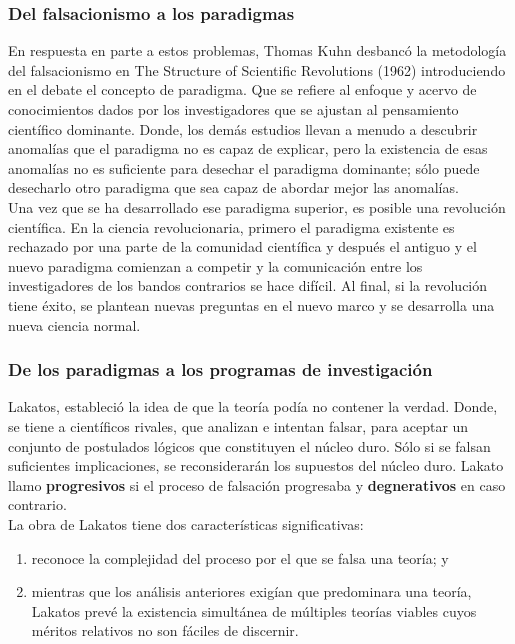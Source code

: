 \documentclass[10pt]{book}
\begin{document}
\subsubsection{Del falsacionismo a los paradigmas}
En respuesta en parte a estos problemas, Thomas Kuhn desbancó la metodología del falsacionismo en The Structure of Scientific Revolutions (1962) introduciendo en el debate el concepto de paradigma. Que se refiere al enfoque y acervo de conocimientos dados por los investigadores que se ajustan al pensamiento científico dominante. Donde, los demás estudios llevan a menudo a descubrir anomalías que el paradigma no es capaz de explicar, pero la existencia de esas anomalías no es suficiente para desechar el paradigma dominante; sólo puede desecharlo otro paradigma que sea capaz de abordar mejor las anomalías.\\

Una vez que se ha desarrollado ese paradigma superior, es posible una revolución científica. En la ciencia revolucionaria, primero el paradigma existente es rechazado por una parte de la comunidad científica y después el antiguo y el nuevo paradigma comienzan a competir y la comunicación entre los investigadores de los bandos contrarios se hace difícil. Al final, si la revolución tiene éxito, se plantean nuevas preguntas en el nuevo marco y se desarrolla una nueva ciencia normal.

\subsubsection{De los paradigmas a los programas de investigación}
Lakatos, estableció la idea de que la teoría podía no contener la verdad. Donde, se tiene a científicos rivales, que analizan e intentan falsar, para aceptar un conjunto de postulados lógicos que constituyen el núcleo duro. Sólo si se falsan suficientes implicaciones, se reconsiderarán los supuestos del núcleo duro. Lakato llamo \textbf{progresivos} si el proceso de falsación progresaba y \textbf{degnerativos} en caso contrario.\\

La obra de Lakatos tiene dos características significativas: 
\begin{enumerate}[1.]
    \item  reconoce la complejidad del proceso por el que se falsa una teoría; y 
    \item mientras que los análisis anteriores exigían que predominara una teoría, Lakatos prevé la existencia simultánea de múltiples teorías viables cuyos méritos relativos no son fáciles de discernir.
\end{enumerate}
\end{document}
